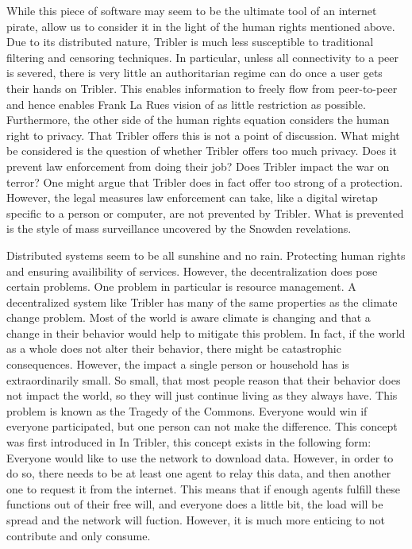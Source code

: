 \documentclass[a4paper,11pt]{book}
\theoremstyle{definition}
\begin{document}
While this piece of software may seem to be the ultimate tool of an internet pirate, 
allow us to consider it in the light of the human rights mentioned above. Due to its
distributed nature, Tribler is much less susceptible to traditional filtering and
censoring techniques. In particular, unless all connectivity to a peer is severed,
there is very little an authoritarian regime can do once a user gets their hands
on Tribler. This enables information to freely flow from peer-to-peer and hence 
enables Frank La Rues vision of as little restriction as possible. 
Furthermore, the other side of the human rights equation considers the human
right to privacy. That Tribler offers this is not a point of discussion. What might
be considered is the question of whether Tribler offers too much privacy. Does it
prevent law enforcement from doing their job? Does Tribler impact the war on terror?
One might argue that Tribler does in fact offer too strong of a protection.
However, the legal measures law enforcement can take, like a digital
wiretap specific to a person or computer, are not prevented by Tribler. What is
prevented is the style of mass surveillance uncovered by the Snowden revelations. 

Distributed systems seem to be all sunshine and no rain. Protecting human rights 
and ensuring availibility of services. However, the decentralization does pose certain 
problems. One problem in particular is resource management. A decentralized system
like Tribler has many of the same properties as the climate change problem. Most of the
world is aware climate is changing and that a change in their behavior would help to
mitigate this problem. In fact, if the world as a whole does not alter their behavior,
there might be catastrophic consequences. However, the impact a single person or household
has is extraordinarily small. So small, that most people reason that their behavior
does not impact the world, so they will just continue living as they always have. 
This problem is known as the Tragedy of the Commons. Everyone would win if everyone
participated, but one person can not make the difference. 
This concept was first introduced in %
In Tribler, this concept exists in the following form: Everyone would like to use 
the network to download data. However, in order to do so, there needs to be at least
one agent to relay this data, and then another one to request it from the internet.
This means that if enough agents fulfill these functions out of their free will,
and everyone does a little bit, the load will be spread and the network will
fuction. However, it is much more enticing to not contribute and only consume.
\end{document}
